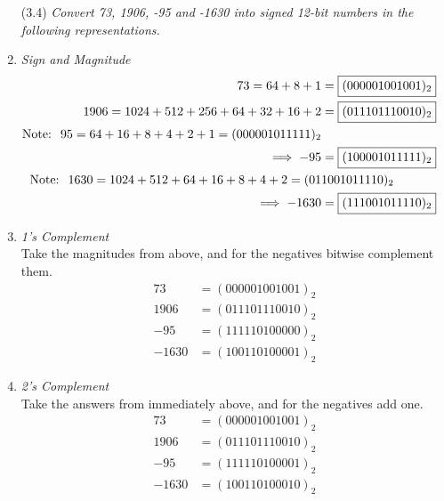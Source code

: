 \documentclass[12pt]{article}
\begin{document}
\begin{enumerate}
\begin{enumerate}
          \vspace{10mm}
          \item[(3.4)] \textit{Convert 73, 1906, -95 and -1630 into signed 12-bit numbers in the following representations.}
            \setcounter{enumii}{0}
            \item \textit{Sign and Magnitude}
              \begin{align*}
                73 = 64 + 8 + 1 &= \boxed{(000001001001)_2} \\
                1906 = 1024 + 512 + 256 + 64 + 32 + 16 + 2 &= \boxed{(011101110010)_2} \\
                \text{Note: \;} 95 = 64 + 16 + 8 + 4 + 2 + 1 = (000001011111)_2 \\
                \implies -95 &= \boxed{(100001011111)_2} \\
                \text{Note: \;} 1630 = 1024 + 512 + 64 + 16 + 8 + 4 + 2 = (01&1001011110)_2 &\\
                \implies -1630 &= \boxed{(111001011110)_2}
              \end{align*}
            \item \textit{1's Complement} \\
              Take the magnitudes from above, and for the negatives bitwise complement them.
              \begin{align*}
                73 &= \boxed{(000001001001)_2} \\
                1906 &= \boxed{(011101110010)_2} \\
                -95 &= \boxed{(111110100000)_2} \\
                -1630 &= \boxed{(100110100001)_2}
              \end{align*}
            \item \textit{2's Complement} \\
              Take the answers from immediately above, and for the negatives add one.
              \begin{align*}
                73 &= \boxed{(000001001001)_2} \\
                1906 &= \boxed{(011101110010)_2} \\
                -95 &= \boxed{(111110100001)_2} \\
                -1630 &= \boxed{(100110100010)_2}
              \end{align*}


\end{enumerate}
\end{enumerate}
\end{document}
